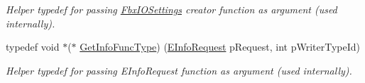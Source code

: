 \begin{DoxyCompactItemize}
\begin{DoxyCompactList}\small\item\em Helper typedef for passing \hyperlink{class_fbx_i_o_settings}{Fbx\+I\+O\+Settings} creator function as argument (used internally). \end{DoxyCompactList}\item 
typedef void $\ast$($\ast$ \hyperlink{class_fbx_writer_a6c13529045946d474e1e69fa0a6b9305}{Get\+Info\+Func\+Type}) (\hyperlink{class_fbx_writer_a250cda8a59afd8e6be01c89cdd914e2a}{E\+Info\+Request} p\+Request, int p\+Writer\+Type\+Id)
\begin{DoxyCompactList}\small\item\em Helper typedef for passing E\+Info\+Request function as argument (used internally). \end{DoxyCompactList}\end{DoxyCompactItemize}
